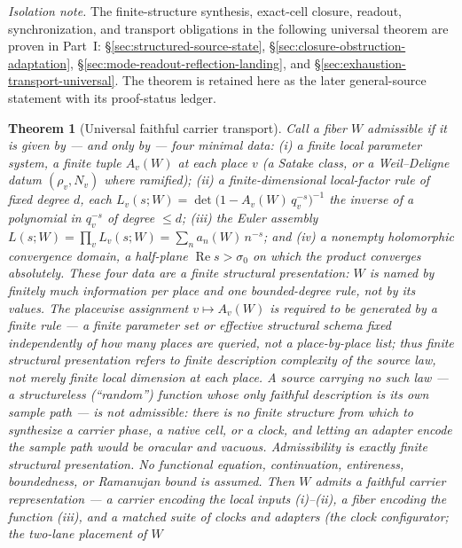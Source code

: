 \documentclass[11pt]{article}
\newtheorem{theorem}{Theorem}
\theoremstyle{definition}
\renewcommand{\Re}{\operatorname{Re}}
\begin{document}
\noindent\emph{Isolation note.} The finite-structure synthesis, exact-cell
closure, readout, synchronization, and transport obligations in the following
universal theorem are proven in Part~I:
\S\ref{sec:structured-source-state}, \S\ref{sec:closure-obstruction-adaptation},
\S\ref{sec:mode-readout-reflection-landing}, and
\S\ref{sec:exhaustion-transport-universal}.  The theorem is retained here as
the later general-source statement with its proof-status ledger.

\begin{theorem}[Universal faithful carrier transport]\label{thm:universal}
Call a fiber $W$ \emph{admissible} if it is given by --- and only by --- four minimal data: \emph{(i)} a
\emph{finite local parameter system}, a finite tuple $A_v(W)$ at each place $v$ (a Satake class, or a
Weil--Deligne datum $(\rho_v,N_v)$ where ramified); \emph{(ii)} a \emph{finite-dimensional local-factor rule} of
fixed degree $d$, each $L_v(s;W)=\det\!\big(1-A_v(W)\,q_v^{-s}\big)^{-1}$ the inverse of a polynomial in
$q_v^{-s}$ of degree $\le d$; \emph{(iii)} the \emph{Euler assembly}
$L(s;W)=\prod_v L_v(s;W)=\sum_n a_n(W)\,n^{-s}$; and \emph{(iv)} a \emph{nonempty holomorphic convergence domain},
a half-plane $\Re s>\sigma_0$ on which the product converges absolutely. These four data are a \emph{finite structural presentation}: $W$ is named by finitely much information per place and one bounded-degree rule, not by its values. The placewise assignment $v\mapsto A_v(W)$ is required to be generated by a \emph{finite rule} --- a finite parameter set or effective structural schema fixed independently of how many places are queried, not a place-by-place list; thus finite structural presentation refers to finite description complexity of the source law, not merely finite local dimension at each place. A source carrying \emph{no} such law --- a structureless (``random'') function whose only faithful description is its own sample path --- is \emph{not} admissible: there is no finite structure from which to synthesize a carrier phase, a native cell, or a clock, and letting an adapter encode the sample path would be oracular and vacuous. Admissibility is \emph{exactly} finite structural presentation. \emph{No functional equation,
continuation, entireness, boundedness, or Ramanujan bound is assumed.} Then $W$ admits a \emph{faithful carrier
representation} --- a carrier encoding the local inputs \emph{(i)--(ii)}, a fiber encoding the function
\emph{(iii)}, and a matched suite of clocks and adapters (the clock configurator; the two-lane placement of $W$

\end{theorem}
\end{document}
